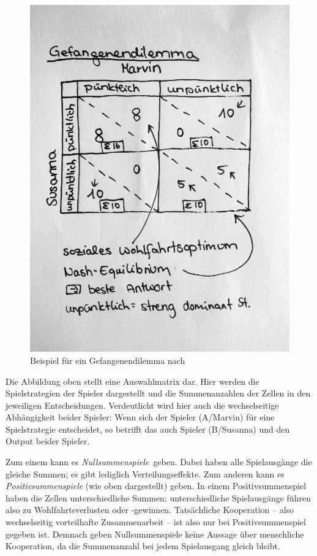 \begin{figure}[htbp]
	\begin{center}
	\includegraphics[width=1\textwidth]{img/gefangendilemma.jpg}
	\caption{Beispiel für ein Gefangenendilemma nach \cite{Kleinberg-2009-oz}}
	\label{fig:gefangenendilemma}
	\end{center}
\end{figure}

Die Abbildung oben stellt eine Auswahlmatrix dar.
Hier werden die Spielstrategien der Spieler dargestellt und die Summenanzahlen der Zellen in den jeweiligen Entscheidungen.
Verdeutlicht wird hier auch die wechselseitige Abhängigkeit beider Spieler: Wenn sich der Spieler (A/Marvin) für eine Spielstrategie entscheidet, so betrifft das auch Spieler (B/Susanna) und den Output beider Spieler.

Zum einem kann es \emph{Nullsummenspiele} geben.
Dabei haben alle Spielausgänge die gleiche Summen; es gibt lediglich Verteilungseffekte.
Zum anderen kann es \emph{Positivsummenspiele} (wie oben dargestellt) geben.
In einem Positivsummenspiel haben die Zellen unterschiedliche Summen; unterschiedliche Spielausgänge führen also zu Wohlfahrtsverlusten oder -gewinnen.
Tatsächliche Kooperation -- also wechselseitig vorteilhafte Zusammenarbeit -- ist also nur bei Positivsummenspiel gegeben ist.
Demnach geben Nullsummenspiele keine Aussage über menschliche Kooperation, da die Summenanzahl bei jedem Spielausgang gleich bleibt.


